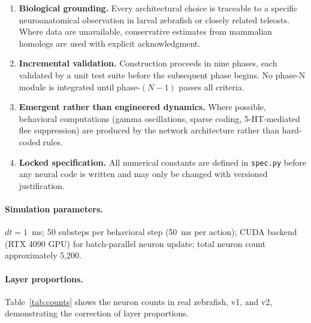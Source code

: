 \documentclass[11pt,a4paper]{article}
\begin{document}
\begin{enumerate}[nosep,leftmargin=2em]
  \item \textbf{Biological grounding.}
    Every architectural choice is traceable to a specific neuroanatomical
    observation in larval zebrafish or closely related teleosts.
    Where data are unavailable, conservative estimates from mammalian
    homologs are used with explicit acknowledgment.
  \item \textbf{Incremental validation.}
    Construction proceeds in nine phases, each validated by a unit test
    suite before the subsequent phase begins.
    No phase-N module is integrated until phase-$(N-1)$ passes all criteria.
  \item \textbf{Emergent rather than engineered dynamics.}
    Where possible, behavioral computations (gamma oscillations,
    sparse coding, 5-HT-mediated flee suppression) are produced by
    the network architecture rather than hard-coded rules.
  \item \textbf{Locked specification.}
    All numerical constants are defined in \texttt{spec.py} before any
    neural code is written and may only be changed with versioned
    justification.
\end{enumerate}

\paragraph{Simulation parameters.}
$dt = 1$~ms; 50 substeps per behavioral step (50~ms per action);
CUDA backend (RTX 4090 GPU) for batch-parallel neuron update;
total neuron count approximately 5,200.

\paragraph{Layer proportions.}
Table~\ref{tab:counts} shows the neuron counts in real zebrafish,
v1, and v2, demonstrating the correction of layer proportions.
\end{document}
